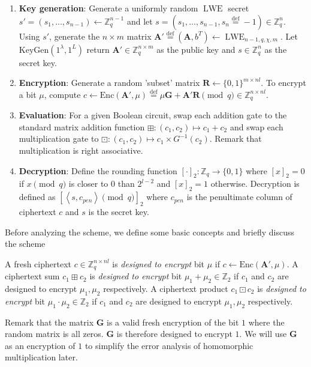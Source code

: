 \begin{enumerate}
    \item \textbf{Key generation}: Generate a uniformly random $\operatorname{LWE}$ secret $s' = (s_1, \dots, s_{n-1}) \leftarrow \mathbb{Z}_q^{n-1}$ and let $s = (s_1, \dots, s_{n-1}, s_n \stackrel{\mathrm{def}}{=} -1) \in \mathbb{Z}_q^{n}$. Using $s'$, generate the $n \times m$ matrix $\mathbf{A}' \stackrel{\mathrm{def}}{=} (\mathbf{A}, b^T) \leftarrow \operatorname{LWE}_{n-1,q,\chi,m}$. Let $\text{KeyGen}(1^\lambda, 1^L)$ return $\mathbf{A}' \in \mathbb{Z}_q^{n \times m}$ as the public key and $s \in \mathbb{Z}_q^n$ as the secret key. 
    \item \textbf{Encryption}: Generate a random 'subset' matrix $\mathbf{R} \leftarrow \{0,1\}^{m \times nl}$. To encrypt a bit $\mu$, compute $c \leftarrow \text{Enc}(\mathbf{A}',\mu) \stackrel{\mathrm{def}}{=} \mu \mathbf{G} + \mathbf{A}'\mathbf{R} \pmod q \in \mathbb{Z}_q^{n\times nl}$.
    \item \textbf{Evaluation}: For a given Boolean circuit, swap each addition gate to the standard matrix addition function $\boxplus \colon (c_1,c_2) \mapsto c_1 + c_2$ and swap each multiplication gate to $\boxdot \colon (c_1, c_2) \mapsto c_1 \times G^{-1}(c_2)$. Remark that multiplication is right associative.
    \item \textbf{Decryption}: Define the rounding function $[\cdot]_2 \colon \mathbb{Z}_q \to \{0,1\}$ where $[x]_2 = 0$ if $x \pmod q$ is closer to $0$ than $2^{l-2}$ and $[x]_2 = 1$ otherwise. Decryption is defined as $[\left \langle s,c_{pen} \right \rangle \pmod q]_2$ where $c_{pen}$ is the penultimate column of ciphertext $c$ and $s$ is the secret key. 
\end{enumerate}

Before analyzing the scheme, we define some basic concepts and briefly discuss the scheme
\begin{definition}
    A fresh ciphertext $c \in \mathbb{Z}_q^{n \times nl}$ is \textit{designed to encrypt} bit $\mu$ if $c \leftarrow \text{Enc}(\mathbf{A}',\mu)$. A ciphertext sum $c_1 \boxplus c_2$ is \textit{designed to encrypt} bit $\mu_1 + \mu_2 \in \mathbb{Z}_2$ if $c_1$ and $c_2$ are designed to encrypt $\mu_1, \mu_2$ respectively. A ciphertext product $c_1 \boxdot c_2$ is \textit{designed to encrypt} bit $\mu_1 \cdot \mu_2 \in \mathbb{Z}_2$ if $c_1$ and $c_2$ are designed to encrypt $\mu_1, \mu_2$ respectively.
\end{definition}
Remark that the matrix $\mathbf{G}$ is a valid fresh encryption of the bit $1$ where the random matrix is all zeros. $\mathbf{G}$ is therefore designed to encrypt $1$. We will use $\mathbf{G}$ as an encryption of $1$ to simplify the error analysis of homomorphic multiplication later. 

